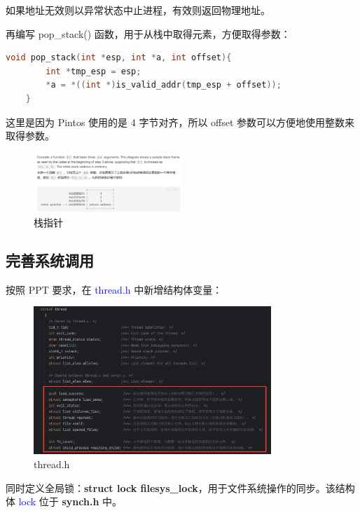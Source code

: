 \documentclass[14pt,a4paper,UTF8,twoside]{article}
\renewcommand{\texttt}[1]{\textcolor{blue}{\ttfamily #1}}
\begin{document}
如果地址无效则以异常状态中止进程，有效则返回物理地址。

再编写 pop\_stack() 函数，用于从栈中取得元素，方便取得参数：

\begin{lstlisting}[language=C, title= pop\_stack()]
    void pop_stack(int *esp, int *a, int offset){
        int *tmp_esp = esp;
        *a = *((int *)is_valid_addr(tmp_esp + offset));
    }
\end{lstlisting}

这里是因为 Pintos 使用的是 4 字节对齐，所以 offset 参数可以方便地使用整数来取得参数。

\begin{figure}[H]
    \centering
    \includegraphics[width=0.5\textwidth]{img5/stackpointer.png}
    \caption{栈指针}
    \label{fig:stack}
\end{figure}

\subsection{完善系统调用}

按照 PPT 要求，在 \texttt{thread.h} 中新增结构体变量：

\begin{figure}[H]
    \centering
    \includegraphics[width=0.8\textwidth]{img5/new.png}
    \caption{thread.h}
    \label{fig:thread}
\end{figure}

同时定义全局锁：\textbf{struct lock filesys\_lock}，用于文件系统操作的同步。该结构体 \texttt{lock} 位于 \textbf{synch.h} 中。
\end{document}

